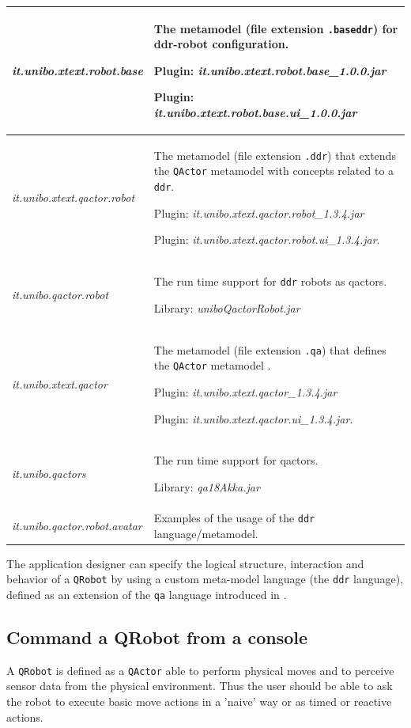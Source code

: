 \noindent
\begin{tabular}{|p{}|p{}|}
\hline 
\textit{it.unibo.xtext.robot.base} 
&The metamodel (file extension \texttt{.baseddr})  for ddr-robot configuration.

\medskip 
Plugin: \textit{it.unibo.xtext.robot.base\_1.0.0.jar} 

Plugin: \textit{it.unibo.xtext.robot.base.ui\_1.0.0.jar}
\\ 
\hline 
\textit{it.unibo.xtext.qactor.robot} 
&The metamodel (file extension \texttt{.ddr}) that extends the \texttt{QActor} metamodel with concepts related to a \texttt{ddr}.

\medskip 
Plugin: \textit{it.unibo.xtext.qactor.robot\_1.3.4.jar}

Plugin: \textit{it.unibo.xtext.qactor.robot.ui\_1.3.4.jar}.
\\ 
\hline 
\textit{it.unibo.qactor.robot} 
&The run time support for \texttt{ddr} robots as qactors.

\medskip 
Library: \textit{uniboQactorRobot.jar}
\\
\hline 
\textit{it.unibo.xtext.qactor} 
&The metamodel (file extension \texttt{.qa}) that defines the \texttt{QActor} metamodel .

\medskip 
Plugin: \textit{it.unibo.xtext.qactor\_1.3.4.jar}

Plugin: \textit{it.unibo.xtext.qactor.ui\_1.3.4.jar}.
\\ 
\hline 
\textit{it.unibo.qactors} 
&The run time support for  qactors.

\medskip 
Library: \textit{qa18Akka.jar}
\\
\hline 
\textit{it.unibo.qactor.robot.avatar} 
&Examples of the usage of the \texttt{ddr} language/metamodel.
\\ 
\hline 
\end{tabular} 
 
\medskip 
The application designer can specify the logical structure, interaction and behavior of a \texttt{QRobot} by using a custom meta-model language (the \texttt{ddr} language), defined as an extension of the \texttt{qa} language introduced in .

\subsection{Command a QRobot from a console }

A \texttt{QRobot} is defined as a \texttt{QActor} able to perform physical moves and to perceive sensor data from the physical environment. Thus the user should be able to ask the robot to execute basic move actions in a 'naive' way or as timed or reactive actions.

